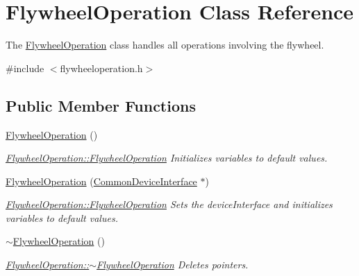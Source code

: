 \hypertarget{class_flywheel_operation}{}\section{Flywheel\+Operation Class Reference}
\label{class_flywheel_operation}


The \hyperlink{class_flywheel_operation}{Flywheel\+Operation} class handles all operations involving the flywheel.  




{\ttfamily \#include $<$flywheeloperation.\+h$>$}

\subsection*{Public Member Functions}
\begin{DoxyCompactItemize}
\item 
\hypertarget{class_flywheel_operation_a4735eb5ddf58ba1d0bf93e37a2885c76}{}\label{class_flywheel_operation_a4735eb5ddf58ba1d0bf93e37a2885c76} 
\hyperlink{class_flywheel_operation_a4735eb5ddf58ba1d0bf93e37a2885c76}{Flywheel\+Operation} ()
\begin{DoxyCompactList}\small\item\em \hyperlink{class_flywheel_operation_a4735eb5ddf58ba1d0bf93e37a2885c76}{Flywheel\+Operation\+::\+Flywheel\+Operation} Initializes variables to default values. \end{DoxyCompactList}\item 
\hyperlink{class_flywheel_operation_aca3144bf0bb443aaa8a2779624d2a5b2}{Flywheel\+Operation} (\hyperlink{class_common_device_interface}{Common\+Device\+Interface} $\ast$)
\begin{DoxyCompactList}\small\item\em \hyperlink{class_flywheel_operation_a4735eb5ddf58ba1d0bf93e37a2885c76}{Flywheel\+Operation\+::\+Flywheel\+Operation} Sets the device\+Interface and initializes variables to default values. \end{DoxyCompactList}\item 
\hypertarget{class_flywheel_operation_af8bc6d0e4f8dde30c067a97c5d8d0953}{}\label{class_flywheel_operation_af8bc6d0e4f8dde30c067a97c5d8d0953} 
\hyperlink{class_flywheel_operation_af8bc6d0e4f8dde30c067a97c5d8d0953}{$\sim$\+Flywheel\+Operation} ()
\begin{DoxyCompactList}\small\item\em \hyperlink{class_flywheel_operation_af8bc6d0e4f8dde30c067a97c5d8d0953}{Flywheel\+Operation\+::$\sim$\+Flywheel\+Operation} Deletes pointers. \end{DoxyCompactList}\item 

\end{DoxyCompactItemize}
